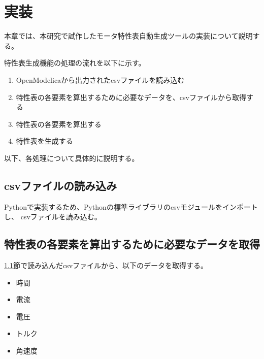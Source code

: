 \chapter{実装}\label{cha:Implementation}

本章では、本研究で試作したモータ特性表自動生成ツールの実装について説明する。




特性表生成機能の処理の流れを以下に示す。
\begin{enumerate}
    \item OpenModelicaから出力されたcsvファイルを読み込む
    \item 特性表の各要素を算出するために必要なデータを、csvファイルから取得する
    \item 特性表の各要素を算出する
    \item 特性表を生成する
\end{enumerate}

以下、各処理について具体的に説明する。

\section{csvファイルの読み込み}\label{csvfairu}
Pythonで実装するため、Pythonの標準ライブラリのcsvモジュールをインポートし、
csvファイルを読み込む。

\section{特性表の各要素を算出するために必要なデータを取得}\label{syutoku_data}
\ref{csvfairu}節で読み込んだcsvファイルから、以下のデータを取得する。

\begin{itemize}
    \item 時間
    \item 電流
    \item 電圧
    \item トルク
    \item 角速度
\end{itemize}

